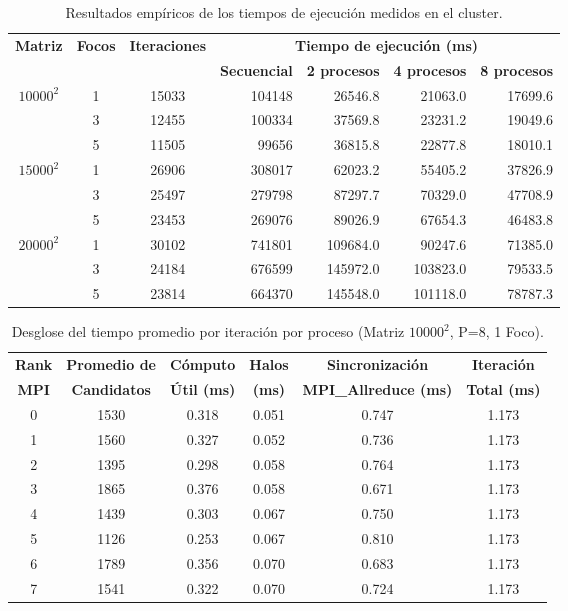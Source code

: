 \documentclass[10pt,a4paper]{article}
\begin{document}
\begin{table}[h]
\centering
\begin{tabular}{|c|c|c|r|r|r|r|}
\hline
\multirow{2}{*}{\textbf{Matriz}} & \multirow{2}{*}{\textbf{Focos}} & \multirow{2}{*}{\textbf{Iteraciones}} & \multicolumn{4}{c|}{\textbf{Tiempo de ejecución (ms)}} \\ \cline{4-7}
 & & & \textbf{Secuencial} & \textbf{2 procesos} & \textbf{4 procesos} & \textbf{8 procesos} \\ \hline
\multirow{3}{*}{$10000^2$} & 1 & 15033 & 104148 & 26546.8 & 21063.0 & 17699.6 \\ \cline{2-7}
 & 3 & 12455 & 100334 & 37569.8 & 23231.2 & 19049.6 \\ \cline{2-7}
 & 5 & 11505 & 99656 & 36815.8 & 22877.8 & 18010.1 \\ \hline
\multirow{3}{*}{$15000^2$} & 1 & 26906 & 308017 & 62023.2 & 55405.2 & 37826.9 \\ \cline{2-7}
 & 3 & 25497 & 279798 & 87297.7 & 70329.0 & 47708.9 \\ \cline{2-7}
 & 5 & 23453 & 269076 & 89026.9 & 67654.3 & 46483.8 \\ \hline
\multirow{3}{*}{$20000^2$} & 1 & 30102 & 741801 & 109684.0 & 90247.6 & 71385.0 \\ \cline{2-7}
 & 3 & 24184 & 676599 & 145972.0 & 103823.0 & 79533.5 \\ \cline{2-7}
 & 5 & 23814 & 664370 & 145548.0 & 101118.0 & 78787.3 \\ \hline
\end{tabular}
\caption{Resultados empíricos de los tiempos de ejecución medidos en el cluster.}
\label{tab:resultados_brutos}
\end{table}

\begin{table}[h]
\centering
\begin{tabular}{|c|c|c|c|c|c|}
\hline
\textbf{Rank} & \textbf{Promedio de} & \textbf{Cómputo} & \textbf{Halos} & \textbf{Sincronización} & \textbf{Iteración} \\
\textbf{MPI} & \textbf{Candidatos} & \textbf{Útil (ms)} & \textbf{(ms)} & \textbf{MPI\_Allreduce (ms)} & \textbf{Total (ms)} \\ \hline
0 & 1530 & 0.318 & 0.051 & 0.747 & 1.173 \\
1 & 1560 & 0.327 & 0.052 & 0.736 & 1.173 \\
2 & 1395 & 0.298 & 0.058 & 0.764 & 1.173 \\
3 & 1865 & 0.376 & 0.058 & 0.671 & 1.173 \\
4 & 1439 & 0.303 & 0.067 & 0.750 & 1.173 \\
5 & 1126 & 0.253 & 0.067 & 0.810 & 1.173 \\
6 & 1789 & 0.356 & 0.070 & 0.683 & 1.173 \\
7 & 1541 & 0.322 & 0.070 & 0.724 & 1.173 \\ \hline
\end{tabular}
\caption{Desglose del tiempo promedio por iteración por proceso (Matriz $10000^2$, P=8, 1 Foco).}
\label{tab:metricas_profiling}
\end{table}
\end{document}
